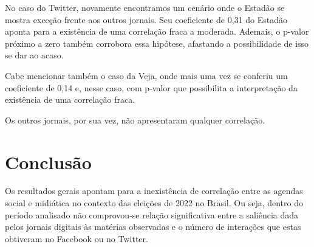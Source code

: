 \documentclass[
	12pt,
	oneside,
	a4paper,
	english,
	brazil
]{abntex2ppgsi}
\begin{document}
No caso do Twitter, novamente encontramos um cenário onde o Estadão se mostra exceção frente aos outros jornais. Seu coeficiente de 0,31 do Estadão aponta para a existência de uma correlação fraca a moderada. Ademais, o p-valor próximo a zero também corrobora essa hipótese, afastando a possibilidade de isso se dar ao acaso.

Cabe mencionar também o caso da Veja, onde mais uma vez se conferiu um coeficiente de 0,14 e, nesse caso, com p-valor que possibilita a interpretação da existência de uma correlação fraca.

Os outros jornais, por sua vez, não apresentaram qualquer correlação.


\chapter{Conclusão}
Os resultados gerais apontam para a inexistência de correlação entre as agendas social e midiática no contexto das eleições de 2022 no Brasil. Ou seja, dentro do período analisado não comprovou-se relação significativa entre a saliência dada pelos jornais digitais às matérias observadas e o número de interações que estas obtiveram no Facebook ou no Twitter.

\postextual

\end{document}
